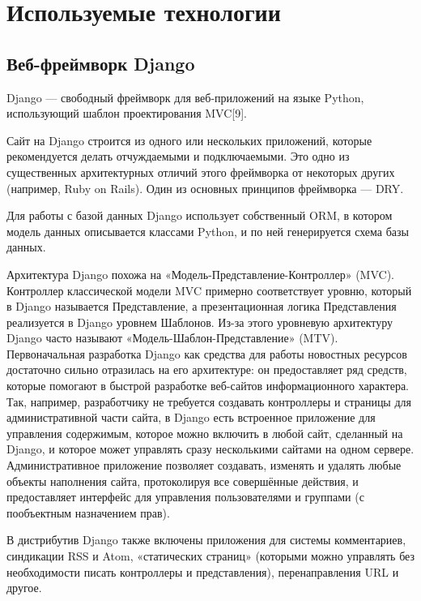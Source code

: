 \lstset{style=fsharpstyle}

\section{Используемые технологии}
\label{sec:practice:technology_used}

\subsection{Веб-фреймворк Django}
Django — свободный фреймворк для веб-приложений на языке Python, использующий шаблон проектирования MVC[9].

Сайт на Django строится из одного или нескольких приложений, которые рекомендуется делать отчуждаемыми и подключаемыми.
Это одно из существенных архитектурных отличий этого фреймворка от некоторых других (например, Ruby on Rails).
Один из основных принципов фреймворка — DRY.

Для работы с базой данных Django использует собственный ORM, в котором модель данных описывается классами Python, и по ней генерируется схема базы данных.

Архитектура Django похожа на «Модель-Представление-Контроллер» (MVC).
Контроллер классической модели MVC примерно соответствует уровню, который в Django называется Представление, а презентационная логика Представления реализуется в Django уровнем Шаблонов.
Из-за этого уровневую архитектуру Django часто называют «Модель-Шаблон-Представление» (MTV).
Первоначальная разработка Django как средства для работы новостных ресурсов достаточно сильно отразилась на его архитектуре: он предоставляет ряд средств, которые помогают в быстрой разработке веб-сайтов информационного характера.
Так, например, разработчику не требуется создавать контроллеры и страницы для административной части сайта, в Django есть встроенное приложение для управления содержимым, которое можно включить в любой сайт, сделанный на Django, и которое может управлять сразу несколькими сайтами на одном сервере.
Административное приложение позволяет создавать, изменять и удалять любые объекты наполнения сайта, протоколируя все совершённые действия, и предоставляет интерфейс для управления пользователями и группами (с пообъектным назначением прав).

В дистрибутив Django также включены приложения для системы комментариев, синдикации RSS и Atom, «статических страниц» (которыми можно управлять без необходимости писать контроллеры и представления), перенаправления URL и другое.

